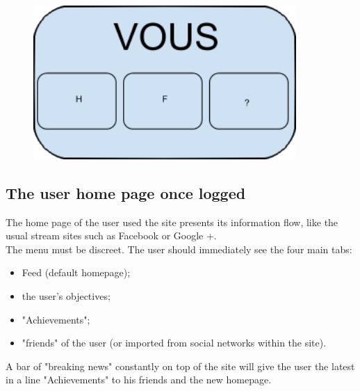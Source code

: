 \documentclass{life-fr}
\begin{document}
\begin{figure}[H]
  \begin{center}
    \includegraphics[width=10cm]{img/vous.png}
  \end{center}
\end{figure}

\subsection{The user home page once logged}

The home page of the user used the site presents its information flow, like the usual stream sites such as Facebook or Google +. \\

The menu must be discreet. The user should immediately see the four main tabs:

\begin{itemize}
  \item Feed (default homepage);
  \item the user's objectives;
  \item "Achievements";
  \item "friends" of the user (or imported from social networks within the site).
\end{itemize}

A bar of "breaking news" constantly on top of the site will give the user the latest in a line "Achievements" to his friends and the new homepage.
\end{document}
